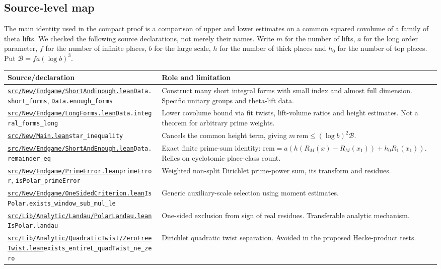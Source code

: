 \documentclass[11pt]{article}
\theoremstyle{remark}\newtheorem{remark}[theorem]{Remark}
\newcommand{\src}[1]{\href{https://github.com/lsernau/grh-lean/blob/72fead102f663d5c7a407964a13dc0cf9d977207/grh-compact/#1}{\nolinkurl{#1}}}
\begin{document}
\subsection{Source-level map}
The main identity used in the compact proof is a comparison of upper and lower estimates on a common squared covolume of a family of theta lifts. We checked the following source declarations, not merely their names. Write $m$ for the number of lifts, $a$ for the long order parameter, $f$ for the number of infinite places, $b$ for the large scale, $h$ for the number of thick places and $h_0$ for the number of top places. Put $\mathcal B=fa(\log b)^3$.
\begin{center}
\small
\begin{tabular}{@{}p{.44\linewidth}p{.51\linewidth}@{}}
\toprule
Source/declaration & Role and limitation\\
\midrule
\src{src/New/Endgame/ShortAndEnough.lean}\newline \texttt{Data.short\_forms}, \texttt{Data.enough\_forms}&Construct many short integral forms with small index and almost full dimension. Specific unitary groups and theta-lift data.\\[2pt]
\src{src/New/Endgame/LongForms.lean}\newline \texttt{Data.integral\_forms\_long}&Lower covolume bound via fit twists, lift-volume ratios and height estimates. Not a theorem for arbitrary prime weights.\\[2pt]
\src{src/New/Main.lean}\newline \texttt{star\_inequality}&Cancels the common height term, giving $m\,\mathrm{rem}\le(\log b)^2\mathcal B$.\\[2pt]
\src{src/New/Endgame/ShortAndEnough.lean}\newline \texttt{Data.remainder\_eq}&Exact finite prime-sum identity: $\mathrm{rem}=a(h(R_M(x)-R_M(x_1))+h_0 R_1(x_1))$. Relies on cyclotomic place-class count.\\[2pt]
\src{src/New/Endgame/PrimeError.lean}\newline \texttt{primeError}, \texttt{isPolar\_primeError}&Weighted non-split Dirichlet prime-power sum, its transform and residues.\\[2pt]
\src{src/New/Endgame/OneSidedCriterion.lean}\newline \texttt{IsPolar.exists\_window\_sub\_mul\_le}&Generic auxiliary-scale selection using moment estimates.\\[2pt]
\src{src/Lib/Analytic/Landau/PolarLandau.lean}\newline \texttt{IsPolar.landau}&One-sided exclusion from sign of real residues. Transferable analytic mechanism.\\[2pt]
\src{src/Lib/Analytic/QuadraticTwist/ZeroFreeTwist.lean}\newline \texttt{exists\_entireL\_quadTwist\_ne\_zero}&Dirichlet quadratic twist separation. Avoided in the proposed Hecke-product tests.\\
\bottomrule
\end{tabular}
\end{center}
\end{document}
